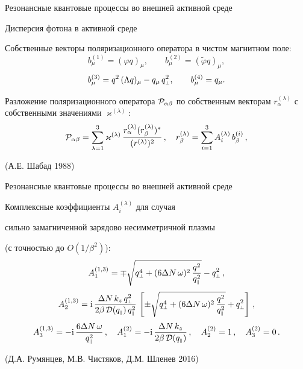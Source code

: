 \documentclass{beamer}
\def\mprp{\mbox{\tiny $\bot$}}
\def\mprl{\mbox{\tiny $\|$}}
\newcommand{\ii}{\mathrm{i}}
\begin{document}
\begin{frame}{Резонансные квантовые процессы во внешней активной среде}
\begin{center}

\alert{Дисперсия фотона в активной среде}

Собственные векторы поляризационного оператора в чистом магнитном поле:
$$b_{\mu}^{(1)} = (\varphi q)_\mu, \qquad
 b_{\mu}^{(2)} = (\tilde \varphi q)_\mu, $$
$$b_{\mu}^{(3)} = q^2 \, (\Lambda q)_\mu - q_\mu \, q^2_{\mbox{\tiny $\bot$}}, 
\qquad b_{\mu}^{(4)} = q_\mu.$$

Разложение поляризационного оператора
${\cal P}_{\alpha \beta}$  по собственным векторам 
$r_{\alpha}^{(\lambda)}$ с собственными 
значениями $\varkappa^{(\lambda)}$:
$${\cal P}_{\alpha \beta} = \sum_{\lambda = 1}^{3} 
 \varkappa^{(\lambda)} \, \frac{r_{\alpha}^{(\lambda)} 
(r_{\beta}^{(\lambda)})^{*}}{(r^{(\lambda)})^2} \, , \quad 
r_{\beta}^{(\lambda)} = \sum\limits_{i = 1}^{3} A_i^{(\lambda)} \, b_{\beta}^{(i)} \, ,$$

(А.Е. Шабад 1988)
\end{center}
\end{frame}
\begin{frame}{Резонансные квантовые процессы во внешней активной среде}
\begin{center}

Комплексные коэффициенты $A_i^{(\lambda)}$ для случая 

\alert{сильно замагниченной зарядово несимметричной плазмы}

 (с точностью до $O(1/\beta^2)$):
$$A_1^{(1,3)} =  \mp \sqrt{q^4_{\mprp} + 
(6 \Delta N \, \omega)^2\, \frac{q^2}{q_{\mprl}^2}}  - q^2_{\mprp} \, ,$$
$$A_2^{(1,3)}  = \ii \,\frac{\Delta N \, k_z \, q^2_{\mprp}}{2\beta \, {\cal D}(q_{\mprl}) 
\, q^2_{\mprl}}\, \left [\pm \sqrt{q^4_{\mprp} + 
(6 \Delta N \, \omega)^2\, \frac{q^2}{q_{\mprl}^2}} + q^2_{\mprp} \right ] \, ,$$
$$A_3^{(1,3)} = - \ii \, \frac{6 \Delta N \, \omega}{q_{\mprl}^2} \, , \quad  
A_1^{(2)} = - \ii \, \frac{\Delta N  \, k_z }{2\beta \, {\cal D}(q_{\mprl})} \, ,  \quad
A_2^{(2)} = 1 \, , \quad  A_3^{(2)} = 0 \, .$$

(Д.А. Румянцев, М.В. Чистяков, Д.М. Шленев 2016)
\end{center}
\end{frame}
\end{document}
